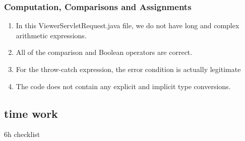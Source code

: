 \documentclass{article}
\begin{document}
\subsubsection{Computation, Comparisons and Assignments}
\begin{enumerate}
	\item In this ViewerServletRequest.java file, we do not have long and complex arithmetic expressions.
	\item All of the comparison and Boolean operators are correct.
	\item For the throw-catch expression, the error condition is actually legitimate
	\item The code does not contain any explicit and implicit type conversions.
\end{enumerate}

\subsection{time work}
6h checklist
\end{document}
